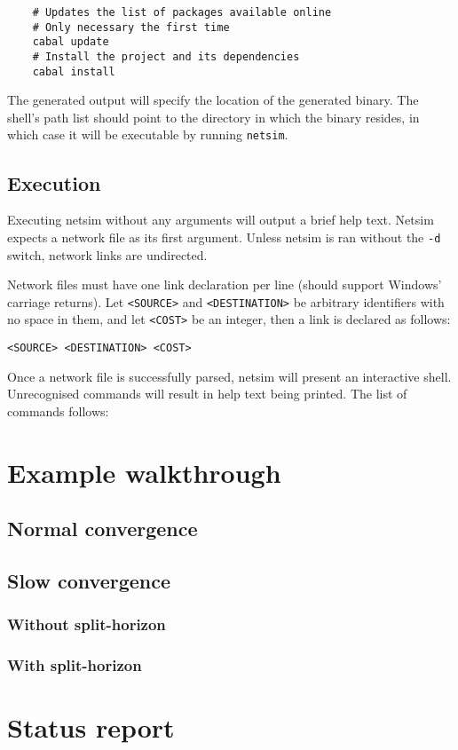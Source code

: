 \documentclass{scrartcl}
\begin{document}
\begin{verbatim}
    # Updates the list of packages available online
    # Only necessary the first time
    cabal update
    # Install the project and its dependencies
    cabal install
\end{verbatim}

The generated output will specify the location of the generated binary. The
shell's path list should point to the directory in which the binary resides, in
which case it will be executable by running \texttt{netsim}.

\subsection{Execution}

Executing netsim without any arguments will output a brief help text. Netsim
expects a network file as its first argument. Unless netsim is ran without the
\texttt{-d} switch, network links are undirected.

Network files must have one link declaration per line (should support Windows'
carriage returns). Let \texttt{<SOURCE>} and \texttt{<DESTINATION>} be arbitrary
identifiers with no space in them, and let \texttt{<COST>} be an integer, then a
link is declared as follows:

\begin{verbatim}
<SOURCE> <DESTINATION> <COST>
\end{verbatim}

Once a network file is successfully parsed, netsim will present an interactive
shell. Unrecognised commands will result in help text being printed. The list of
commands follows:

\section{Example walkthrough}

\subsection{Normal convergence}

\subsection{Slow convergence}
\subsubsection{Without split-horizon}
\subsubsection{With split-horizon}

\section{Status report}
\end{document}
